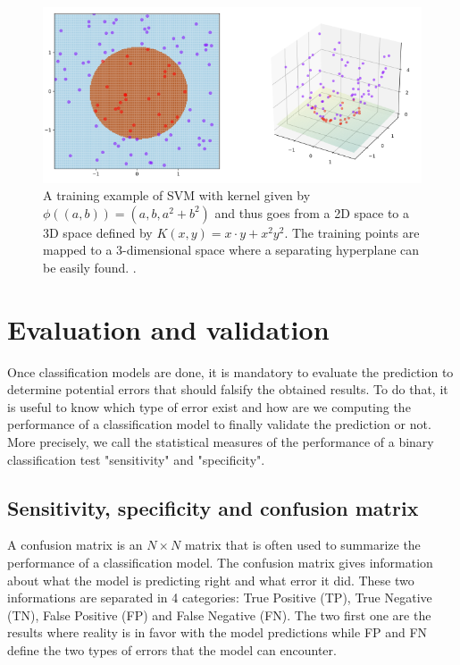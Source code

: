 \documentclass[11pt, openany]{report}
\theoremstyle{plain}
\theoremstyle{definition}
\theoremstyle{remark}
\begin{document}
\begin{figure}[h]
  \centering
  \includegraphics[scale=0.65]{figures/kernel-trick.png}
  \caption{A training example of SVM with kernel given by $\phi((a, b)) = (a, b, a^{2} + b^{2})$ and thus goes from a 2D space to a 3D space defined by $K(x, y) = x \cdot y + x^2 y^2$. The training points are mapped to a 3-dimensional space where a separating hyperplane can be easily found. \cite{wiki-svm}.}
  \label{fig:kernel-trick}
\end{figure}

\newpage
\section{Evaluation and validation} \label{sec:evaluation}
 
Once classification models are done, it is mandatory to evaluate the prediction to determine potential errors that should falsify the obtained results.  To do that, it is useful to know which type of error exist and how are we computing the performance of a classification model to finally validate the prediction or not. More precisely, we call the statistical measures of the performance of a binary classification test "sensitivity" and "specificity". 

\subsection{Sensitivity, specificity and confusion matrix}
A confusion matrix is an $N \times N$ matrix that is often used to summarize the performance of a classification model. The confusion matrix gives information about what the model is predicting right and what error it did. These two informations are separated in 4 categories: True Positive (TP), True Negative (TN), False Positive (FP) and False Negative (FN). The two first one are the results where reality is in favor with the model predictions while FP and FN define the two types of errors that the model can encounter.
\end{document}
